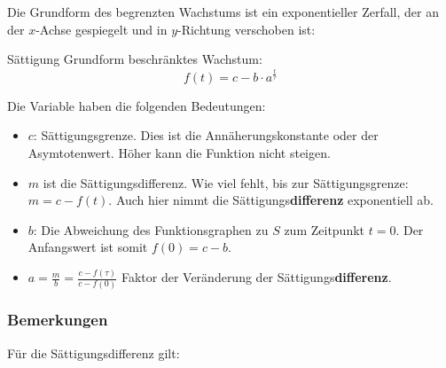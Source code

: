 Die Grundform des begrenzten Wachstums ist ein exponentieller Zerfall,
der an der $x$-Achse gespiegelt und in $y$-Richtung
verschoben ist:

\begin{gesetz}{Sättigung}{}
  Grundform beschränktes Wachstum:
$$f(t) =c - b\cdot{} a^{\frac{t}{\tau}}$$
\end{gesetz}

Die Variable haben die folgenden Bedeutungen:

\begin{itemize}
	\item $c$: Sättigungsgrenze. Dies ist die Annäherungskonstante oder der Asymtotenwert. Höher kann die Funktion nicht steigen.

	\item $m$ ist die
    Sättigungsdifferenz. Wie viel fehlt, bis zur
    Sättigungsgrenze: $m = c - f(t)$. Auch hier nimmt die Sättigungs\textbf{differenz} exponentiell ab.
	\item $b$: Die Abweichung des Funktionsgraphen zu $S$ zum Zeitpunkt $t=0$. Der
    Anfangswert ist somit $f(0) = c - b$.
\item $a=\frac{m}{b}=\frac{c-f(\tau)}{c-f(0)}$ Faktor der Veränderung
  der Sättigungs\textbf{differenz}.
\end{itemize}


\subsubsection{Bemerkungen}
\begin{bemerkung}{}{}
  Für die Sättigungsdifferenz gilt:

\end{bemerkung}



